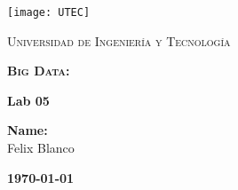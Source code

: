 \documentclass[a4paper, 10pt]{report}
\begin{document}
\begin{titlepage}
	\centering
	\texttt{[image: UTEC]} \par \vspace{1cm}
	{\scshape\LARGE Universidad de Ingeniería y Tecnología \par}
	\vspace{2cm}
	{\scshape\huge\bfseries Big Data: \par}
	{\huge\bfseries Lab 05\par}
	\vspace{4cm}
	{\Large {\bfseries Name:} \\
					Felix Blanco \\
	\par}
	\vfill
	{\large\bfseries \today \par}
\end{titlepage}


\end{document}
